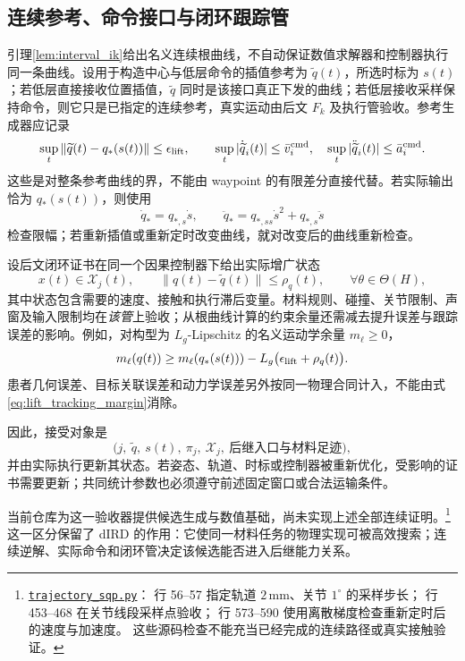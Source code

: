 \documentclass[UTF8,fontset=fandol,zihao=5,a4paper]{ctexart}
\theoremstyle{definition}
\theoremstyle{remark}\newtheorem{remark}[theorem]{说明}
\numberwithin{equation}{section}
\begin{document}
\subsection{连续参考、命令接口与闭环跟踪管}
\label{sec:command_tube}
引理\ref{lem:interval_ik}给出名义连续根曲线，不自动保证数值求解器和控制器执行同一条曲线。设用于构造中心与低层命令的插值参考为 $\widetilde q(t)$，所选时标为 $s(t)$；若低层直接接收位置插值，$\widetilde q$ 同时是该接口真正下发的曲线；若低层接收采样保持命令，则它只是已指定的连续参考，真实运动由后文 $F_k$ 及执行管验收。参考生成器应记录
\begin{equation}
 \sup_t\|\widetilde q(t)-q_*(s(t))\|\le\epsilon_{\rm lift},
 \qquad
 \sup_t|\dot{\widetilde q}_i(t)|\le \bar v_i^{\rm cmd},\quad
 \sup_t|\ddot{\widetilde q}_i(t)|\le \bar a_i^{\rm cmd}.
 \label{eq:actual_command_contract}
\end{equation}
这些是对整条参考曲线的界，不能由 waypoint 的有限差分直接代替。若实际输出恰为 $q_*(s(t))$，则使用
\[
 \dot q_*=q_{*,s}\dot s,\qquad
 \ddot q_*=q_{*,ss}\dot s^2+q_{*,s}\ddot s
\]
检查限幅；若重新插值或重新定时改变曲线，就对改变后的曲线重新检查。

设后文闭环证书在同一个因果控制器下给出实际增广状态
\begin{equation}
 x(t)\in\mathcal X_j(t),\qquad
 \|q(t)-\widetilde q(t)\|\le\rho_q(t),
 \qquad \forall \theta\in\Theta(H),
 \label{eq:tracking_interface}
\end{equation}
其中状态包含需要的速度、接触和执行滞后变量。材料规则、碰撞、关节限制、声窗及输入限制均在\emph{该管}上验收；从根曲线计算的约束余量还需减去提升误差与跟踪误差的影响。例如，对构型为 $L_g$-Lipschitz 的名义运动学余量 $m_\ell\ge0$，
\begin{equation}
 m_\ell(q(t))\ge m_\ell(q_*(s(t)))
       -L_g\big(\epsilon_{\rm lift}+\rho_q(t)\big).
 \label{eq:lift_tracking_margin}
\end{equation}
患者几何误差、目标关联误差和动力学误差另外按同一物理合同计入，不能由式\eqref{eq:lift_tracking_margin}消除。

因此，接受对象是
\[
 \bigl(j,\ \widetilde q,\ s(t),\ \pi_j,\ \mathcal X_j,\ 
       \text{后继入口与材料足迹}\bigr),
\]
并由实际执行更新其状态。若姿态、轨道、时标或控制器被重新优化，受影响的证书需要更新；共同统计参数也必须遵守前述固定窗口或合法运输条件。

当前仓库为这一验收器提供候选生成与数值基础，尚未实现上述全部连续证明。\footnote{
\href{https://github.com/NingMeng0903/RealUS_playground/blob/d7e22042907c7b8058d70152f1c9b201a5adee01/ird_playground/ird_playground/optimization/trajectory_sqp.py}{\texttt{trajectory\_sqp.py}}：
行 56--57 指定轨道 $2\,\mathrm{mm}$、关节 $1^\circ$ 的采样步长；
行 453--468 在关节线段采样点验收；
行 573--590 使用离散梯度检查重新定时后的速度与加速度。
这些源码检查不能充当已经完成的连续路径或真实接触验证。}
这一区分保留了 dIRD 的作用：它使同一材料任务的物理实现可被高效搜索；连续逆解、实际命令和闭环管决定该候选能否进入后继能力关系。
\end{document}
